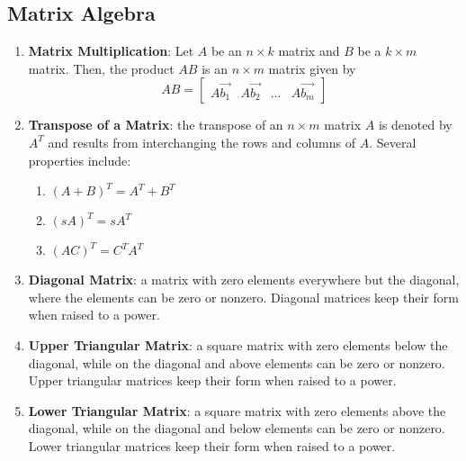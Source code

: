 \documentclass[10pt]{article}
\begin{document}
\subsection{Matrix Algebra}
\begin{enumerate}
\item \textbf{Matrix Multiplication}: Let $A$ be an $n \times k$ matrix and $B$ be a $k \times m$ matrix. Then, the product $AB$ is an $n \times m$ matrix given by
$$AB = \begin{bmatrix}
A\vec{b_1} & A\vec{b_2} & ... & A\vec{b_m}
\end{bmatrix}$$
\item \textbf{Transpose of a Matrix}: the transpose of an $n \times m$ matrix $A$ is denoted by $A^T$ and results from interchanging the rows and columns of $A$. Several properties include:
\begin{enumerate}
\item $(A + B)^T = A^T + B^T$
\item $(sA)^T = sA^T$
\item $(AC)^T = C^TA^T$
\end{enumerate}
\item \textbf{Diagonal Matrix}: a matrix with zero elements everywhere but the diagonal, where the elements can be zero or nonzero. Diagonal matrices keep their form when raised to a power.
\item \textbf{Upper Triangular Matrix}: a square matrix with zero elements below the diagonal, while on the diagonal and above elements can be zero or nonzero. Upper triangular matrices keep their form when raised to a power.
\item \textbf{Lower Triangular Matrix}: a square matrix with zero elements above the diagonal, while on the diagonal and below elements can be zero or nonzero. Lower triangular matrices keep their form when raised to a power.
\end{enumerate}
\end{document}
